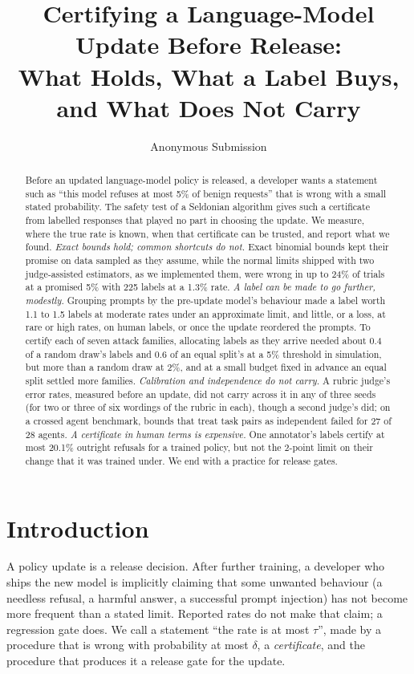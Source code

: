 \documentclass[letterpaper]{article} %
\title{Certifying a Language-Model Update Before Release:\\What Holds, What a Label Buys, and What Does Not Carry}
\author{Anonymous Submission}
\begin{document}
\maketitle

\begin{abstract}
Before an updated language-model policy is released, a developer wants a statement such as ``this model refuses at
most 5\% of benign requests'' that is wrong with a small stated probability. The safety test of a Seldonian algorithm
gives such a certificate from labelled responses that played no part in choosing the update. We measure, where the true
rate is known, when that certificate can be trusted, and report what we found. \emph{Exact bounds hold; common shortcuts
do not.} Exact binomial bounds kept their promise on data sampled as they assume, while the normal limits shipped with
two judge-assisted estimators, as we implemented them, were wrong in up to 24\% of trials at a promised 5\% with 225
labels at a 1.3\% rate. \emph{A label can be made to go
further, modestly.} Grouping prompts by the pre-update model's behaviour made a label worth 1.1 to 1.5 labels at
moderate rates under an approximate limit, and little, or a loss, at rare or high rates, on human labels, or once the update reordered the
prompts. To certify each of seven attack families, allocating labels as they arrive needed about 0.4 of a random
draw's labels and 0.6 of an equal split's at a 5\% threshold in simulation, but more than a random draw at 2\%, and at
a small budget fixed in advance an equal split settled more families. \emph{Calibration and independence do not carry.} A rubric judge's
error rates, measured before an update, did not carry across it in any of three seeds (for two or three of six wordings of the rubric in each), though a second
judge's did; on
a crossed agent benchmark, bounds that treat task pairs as independent failed for 27 of 28 agents. \emph{A certificate
in human terms is expensive.} One annotator's labels certify at most 20.1\% outright refusals for a trained policy, but
not the 2-point limit on their change that it was trained under. We end with a practice for release gates.
\end{abstract}

\section{Introduction}

A policy update is a release decision. After further training, a developer who ships the new model is implicitly
claiming that some unwanted behaviour (a needless refusal, a harmful answer, a successful prompt injection) has not
become more frequent than a stated limit. Reported rates do not make that claim; a regression gate does. We call a
statement ``the rate is at most $\tau$'', made by a procedure that is wrong with probability at most $\delta$, a
\emph{certificate}, and the procedure that produces it a release gate for the update.
\end{document}
